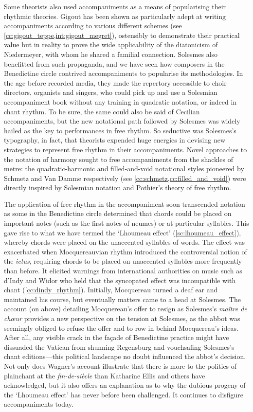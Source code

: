 Some theorists also used accompaniments as a means of popularising their rhythmic theories.
Gigout has been shown as particularly adept at writing accompaniments according to various different schemes (see \cref{cc:gigout_teppe,int:gigout_megret}), ostensibly to demonstrate their practical value but in reality to prove the wide applicability of the diatonicism of Niedermeyer, with whom he shared a familial connection.
Solesmes also benefitted from such propaganda, and we have seen how composers in the Benedictine circle contrived accompaniments to popularise its methodologies.
In the age before recorded media, they made the repertory accessible to choir directors, organists and singers, who could pick up and use a Solesmian accompaniment book without any training in quadratic notation, or indeed in chant rhythm.
To be sure, the same could also be said of Cecilian accompaniments, but the new notational path followed by Solesmes was widely hailed as the key to performances in free rhythm.
So seductive was Solesmes's typography, in fact, that theorists expended huge energies in devising new strategies to represent free rhythm in their accompaniments.
Novel approaches to the notation of harmony sought to free accompaniments from the shackles of metre: the quadratic-harmonic and filled-and-void notational styles pioneered by Schmetz and Van Damme respectively (see \cref{cc:schmetz,cc:filled_and_void}) were directly inspired by Solesmian notation and Pothier's theory of free rhythm.

The application of free rhythm in the accompaniment soon transcended notation as some in the Benedictine circle determined that chords could be placed on important notes (such as the first notes of neumes) or at particular syllables.
This gave rise to what we have termed the `Lhoumeau effect' (\cref{sc:lhoumeau_effect}), whereby chords were placed on the unaccented syllables of words.
The effect was exacerbated when Mocquereauvian rhythm introduced the controversial notion of the \emph{ictus}, requiring chords to be placed on unaccented syllables more frequently than before.
It elicited warnings from international authorities on music such as d'Indy and Widor who held that the syncopated effect was incompatible with chant (\cref{cc:dindy_rhythm}).
Initially, Mocquereau turned a deaf ear and maintained his course, but eventually matters came to a head at Solesmes.
The account (on  above) detailing Mocquereau's offer to resign as Solesmes's \emph{maître de chœur} provides a new perspective on the tension at Solesmes, as the abbot was seemingly obliged to refuse the offer and to row in behind Mocquereau's ideas.
After all, any visible crack in the façade of Benedictine practice might have dissuaded the Vatican from shunning Regensburg and vouchsafing Solesmes's chant editions---this political landscape no doubt influenced the abbot's decision.
Not only does Wagner's account illustrate that there is more to the politics of plainchant at the \emph{fin-de-siècle} than Katharine Ellis and others have acknowledged, but it also offers an explanation as to why the dubious progeny of the `Lhoumeau effect' has never before been challenged.
It continues to disfigure accompaniments today.
\noclub[2]

